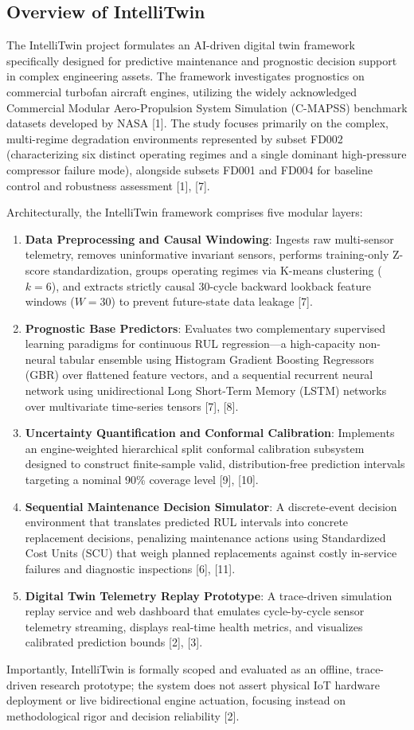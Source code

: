 \documentclass[12pt,a4paper]{article}
\begin{document}
\subsection{Overview of IntelliTwin}
The IntelliTwin project formulates an AI-driven digital twin framework specifically designed for predictive maintenance and prognostic decision support in complex engineering assets. The framework investigates prognostics on commercial turbofan aircraft engines, utilizing the widely acknowledged Commercial Modular Aero-Propulsion System Simulation (C-MAPSS) benchmark datasets developed by NASA [1]. The study focuses primarily on the complex, multi-regime degradation environments represented by subset FD002 (characterizing six distinct operating regimes and a single dominant high-pressure compressor failure mode), alongside subsets FD001 and FD004 for baseline control and robustness assessment [1], [7].

Architecturally, the IntelliTwin framework comprises five modular layers:
\begin{enumerate}
    \item \textbf{Data Preprocessing and Causal Windowing}: Ingests raw multi-sensor telemetry, removes uninformative invariant sensors, performs training-only Z-score standardization, groups operating regimes via K-means clustering ($k=6$), and extracts strictly causal 30-cycle backward lookback feature windows ($W=30$) to prevent future-state data leakage [7].
    \item \textbf{Prognostic Base Predictors}: Evaluates two complementary supervised learning paradigms for continuous RUL regression—a high-capacity non-neural tabular ensemble using Histogram Gradient Boosting Regressors (GBR) over flattened feature vectors, and a sequential recurrent neural network using unidirectional Long Short-Term Memory (LSTM) networks over multivariate time-series tensors [7], [8].
    \item \textbf{Uncertainty Quantification and Conformal Calibration}: Implements an engine-weighted hierarchical split conformal calibration subsystem designed to construct finite-sample valid, distribution-free prediction intervals targeting a nominal 90\% coverage level [9], [10].
    \item \textbf{Sequential Maintenance Decision Simulator}: A discrete-event decision environment that translates predicted RUL intervals into concrete replacement decisions, penalizing maintenance actions using Standardized Cost Units (SCU) that weigh planned replacements against costly in-service failures and diagnostic inspections [6], [11].
    \item \textbf{Digital Twin Telemetry Replay Prototype}: A trace-driven simulation replay service and web dashboard that emulates cycle-by-cycle sensor telemetry streaming, displays real-time health metrics, and visualizes calibrated prediction bounds [2], [3].
\end{enumerate}
Importantly, IntelliTwin is formally scoped and evaluated as an offline, trace-driven research prototype; the system does not assert physical IoT hardware deployment or live bidirectional engine actuation, focusing instead on methodological rigor and decision reliability [2].
\end{document}
